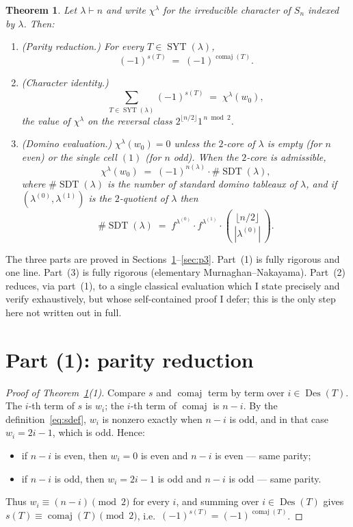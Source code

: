 \documentclass[11pt]{article}
\newtheorem{theorem}{Theorem}
\theoremstyle{definition}
\DeclareMathOperator{\Des}{Des}
\DeclareMathOperator{\comaj}{comaj}
\DeclareMathOperator{\SYT}{SYT}
\DeclareMathOperator{\SDT}{SDT}
\newcommand{\wzero}{w_0}
\begin{document}
\begin{theorem}\label{thm:main}
Let $\lambda\vdash n$ and write $\chi^\lambda$ for the irreducible character of
$S_n$ indexed by $\lambda$.  Then:
\begin{enumerate}
\item[\textup{(1)}] \emph{(Parity reduction.)}  For every $T\in\SYT(\lambda)$,
\[
(-1)^{s(T)}\;=\;(-1)^{\comaj(T)}.
\]
\item[\textup{(2)}] \emph{(Character identity.)}
\[
\sum_{T\in\SYT(\lambda)}(-1)^{s(T)}\;=\;\chi^\lambda(\wzero),
\]
the value of $\chi^\lambda$ on the reversal class $2^{\lfloor n/2\rfloor}1^{\,n\bmod2}$.
\item[\textup{(3)}] \emph{(Domino evaluation.)}
$\chi^\lambda(\wzero)=0$ unless the $2$-core of $\lambda$ is empty (for $n$ even)
or the single cell $(1)$ (for $n$ odd).  When the $2$-core is admissible,
\[
\chi^\lambda(\wzero)\;=\;(-1)^{n(\lambda)}\cdot\#\SDT(\lambda),
\]
where $\#\SDT(\lambda)$ is the number of standard domino tableaux of $\lambda$,
and if $(\lambda^{(0)},\lambda^{(1)})$ is the $2$-quotient of $\lambda$ then
\[
\#\SDT(\lambda)\;=\;f^{\lambda^{(0)}}\cdot f^{\lambda^{(1)}}\cdot
\binom{\lfloor n/2\rfloor}{\,|\lambda^{(0)}|\,}.
\]
\end{enumerate}
\end{theorem}

The three parts are proved in Sections~\ref{sec:p1}--\ref{sec:p3}.  Part~(1) is
fully rigorous and one line.  Part~(3) is fully rigorous (elementary
Murnaghan--Nakayama).  Part~(2) reduces, via part~(1), to a single classical
evaluation which I state precisely and verify exhaustively, but whose
self-contained proof I defer; this is the only step here not written out in full.

\section{Part (1): parity reduction}\label{sec:p1}

\begin{proof}[Proof of Theorem~\ref{thm:main}(1)]
Compare $s$ and $\comaj$ term by term over $i\in\Des(T)$.  The $i$-th term of $s$
is $w_i$; the $i$-th term of $\comaj$ is $n-i$.  By the definition~\eqref{eq:sdef},
$w_i$ is nonzero exactly when $n-i$ is odd, and in that case $w_i=2i-1$, which is
odd.  Hence:
\begin{itemize}
\item if $n-i$ is even, then $w_i=0$ is even and $n-i$ is even --- same parity;
\item if $n-i$ is odd, then $w_i=2i-1$ is odd and $n-i$ is odd --- same parity.
\end{itemize}
Thus $w_i\equiv (n-i)\pmod 2$ for every $i$, and summing over $i\in\Des(T)$ gives
$s(T)\equiv\comaj(T)\pmod 2$, i.e.\ $(-1)^{s(T)}=(-1)^{\comaj(T)}$.
\end{proof}
\end{document}
